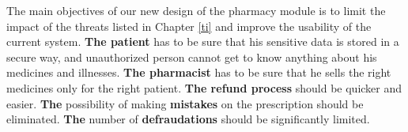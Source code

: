 The main objectives of our new design of the pharmacy module is to limit the impact of the threats listed in Chapter \ref{ti} and improve the usability of the current system.
\newline
\textbf{ The patient} has to be sure that his sensitive data is stored in a secure way, and unauthorized person cannot get to know anything about his medicines and illnesses. 
\newline
\textbf{The pharmacist} has to be sure that he sells the right medicines only for the right patient. 
\newline
\textbf{The refund process} should be quicker and easier. 
\newline
\textbf{The} possibility of making \textbf{mistakes} on the prescription should be eliminated. 
\newline
\textbf{The} number of \textbf{defraudations} should be significantly limited.